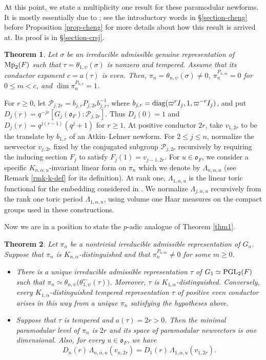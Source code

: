 \documentclass[12pt]{amsart}
\newtheorem{theorem}{Theorem}[section] %
\theoremstyle{definition}
\theoremstyle{remark}
\begin{document}
At this point, we state a multiplicity one result for these paramodular newforms. It is mostly essentially due to \cite{che26}; see the introductory words in \S \ref{section-cheng} before Proposition \ref{prop-cheng} for more details about how this result is arrived at. Its proof is in \S \ref{section-crsj}.

\begin{theorem}\label{thm-cheng}
Let $\sigma$ be an irreducible admissible genuine representation of ${\rm Mp}_2(F)$ such that
$\tau=\theta_{1,\psi}(\sigma)$
is nonzero and tempered.  Assume that its conductor exponent $c=a(\tau)$ is even. Then, $\pi_n=\theta_{n,\psi}(\sigma)\neq0$, $\pi_n^{P_{n,m}}=0$ for $0\le m<c$, and $\dim\pi_n^{P_{n,c}} = 1$. 
\end{theorem}

For $r\geq 0$, let $\mathcal P_{j,2r}=b_{j,r}P_{j,2r}b_{j,r}^{-1}$, where $b_{j,r}={\rm diag}(\varpi^r I_j,1,\varpi^{-r}I_j)$, and put $D_j(r)=q^{-jr}[G_j(\mathfrak o_F):\mathcal P_{j,2r}]$. Thus $D_j(0)=1$ and $D_j(r)=q^{j(r-1)}(q^j+1)$ for $r\geq 1$. At positive conductor $2r$, take $v_{1,2r}$ to be the translate by $b_{1,r}$ of an Atkin–Lehner newform. 
For $2\le j\le n$, normalize the newvector $v_{j,2r}$ fixed by the conjugated subgroup $\mathcal P_{j,2r}$ recursively by requiring the inducing section $F_j$ to satisfy $F_j(1)=v_{j-1,2r}$.
For $u \in \mathfrak o_F$, we consider a specific $K_{n,\alpha,u}$-invariant linear form on $\pi_n$ which we denote by $\Lambda_{n,\alpha,u}$ (see Remark \ref{rmk-k-def} for its definition). 
At rank one, $\Lambda_{1,\alpha,u}$ is the linear toric functional for the embedding considered in
\cite[\S7]{bhko24}. We normalize $\Lambda_{j,\alpha,u}$ recursively from the rank one toric period $\Lambda_{1,\alpha,u}$, using volume one Haar measures on the compact groups used in these constructions. 

Now we are in a position to state the $p$-adic analogue of Theorem \ref{thm1}. 

\begin{theorem}\label{thm2} 
Let $\pi_n$ be a nontrivial irreducible admissible representation of $G_n$. Suppose that $\pi_n$ is $K_{n,\alpha}$-distinguished and that $\pi_n^{P_{n,m}}\ne0$ for some $m\ge0$.
\begin{itemize}
\item[1.] There is a unique irreducible admissible representation $\tau$ of $G_1\simeq {\rm PGL}_2(F)$ such that
 $\pi_n\simeq\theta_{n,\psi}\bigl(\theta_{1,\psi}^{\leftarrow}(\tau)\bigr)$. 
Moreover, $\tau$ is $K_{1,\alpha}$-distinguished. Conversely, every $K_{1,\alpha}$-distinguished tempered representation $\tau$ of positive even conductor arises in this way from a unique $\pi_n$ satisfying the hypotheses above.
\item[2.] Suppose that $\tau$ is tempered and $a(\tau)=2r>0$. Then the minimal paramodular level of $\pi_n$ is $2r$ and its space of paramodular newvectors is one dimensional. Also, for every $u\in\mathfrak o_F$, we have
   \[
   D_n(r)\,\Lambda_{n,\alpha,u}(v_{n,2r})
   =
   D_1(r)\,\Lambda_{1,\alpha,u}(v_{1,2r}).
   \]
\end{itemize}   
\end{theorem}
\end{document}
